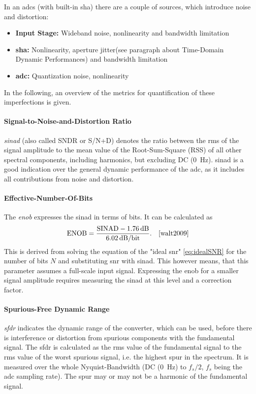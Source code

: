 In an \glspl{adc} (with built-in \gls{sha}) there are a couple of sources, which introduce noise and distortion:
\begin{itemize}
	\item \textbf{Input Stage:} Wideband noise, nonlinearity and bandwidth limitation
	\item \textbf{\gls{sha}:} Nonlinearity, aperture jitter(see paragraph about Time-Domain Dynamic Performances)  and bandwidth limitation
	\item \textbf{\gls{adc}:} Quantization noise, nonlinearity
\end{itemize}

In the following, an overview of the metrics for quantification of these imperfections is given. 


\paragraph{Signal-to-Noise-and-Distortion Ratio}
\textit{\gls{sinad}} (also called SNDR or S/N+D) denotes the ratio between the \gls{rms} of the signal amplitude to the mean value of the Root-Sum-Square (RSS) of all other spectral components, including harmonics, but excluding  DC (\SI{0}{\hertz}). \gls{sinad} is a good indication over the general dynamic performance of the \gls{adc}, as it includes all contributions from noise and distortion.

\paragraph{Effective-Number-Of-Bits}
The \textit{\gls{enob}} expresses the \gls{sinad} in terms of bits. It can be calculated as
\begin{equation}
	\text{ENOB} = \frac{\text{SINAD}-\SI{1.76}{\decibel}}{\SI{6.02}{\decibel}/\text{bit}}. \quad \cite{walt2009}
\end{equation}
This is derived from solving the equation of the "ideal \gls{snr}" \autoref{eq:idealSNR} for the number of bits $N$ and substituting \gls{snr} with \gls{sinad}. This however means, that this parameter assumes a full-scale input signal. Expressing the \gls{enob} for a smaller signal amplitude requires measuring the \gls{sinad} at this level and a correction factor. \cite{walt}


\paragraph{Spurious-Free Dynamic Range}
\textit{\gls{sfdr}} indicates the dynamic range of the converter, which can be used, before there is interference or distortion from spurious components with the fundamental signal. \cite{Lundberg} The \gls{sfdr} is calculated as the \gls{rms} value of the fundamental signal to the \gls{rms} value of the worst spurious signal, i.e. the highest spur in the spectrum. It is measured over the whole Nyquist-Bandwidth (DC (\SI{0}{\hertz}) to $f_s/2$, $f_s$ being the \gls{adc} sampling rate). The spur may or may not be a harmonic of the fundamental signal. \cite{walt2009} \cite{Lundberg}

